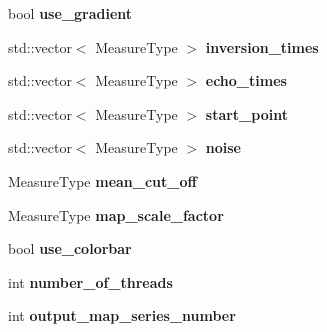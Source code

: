\begin{DoxyCompactItemize}
\item 
\hypertarget{struct_ox_1_1_tomato_options_a367c540e5413f8ffa3a6bc6ef5781b45}{bool {\bfseries use\-\_\-gradient}}\label{struct_ox_1_1_tomato_options_a367c540e5413f8ffa3a6bc6ef5781b45}

\item 
\hypertarget{struct_ox_1_1_tomato_options_ab7ac986b6ad257e73eda3d524f85fe85}{std\-::vector$<$ Measure\-Type $>$ {\bfseries inversion\-\_\-times}}\label{struct_ox_1_1_tomato_options_ab7ac986b6ad257e73eda3d524f85fe85}

\item 
\hypertarget{struct_ox_1_1_tomato_options_ae70219d5c42877178575baa5d6ae51c3}{std\-::vector$<$ Measure\-Type $>$ {\bfseries echo\-\_\-times}}\label{struct_ox_1_1_tomato_options_ae70219d5c42877178575baa5d6ae51c3}

\item 
\hypertarget{struct_ox_1_1_tomato_options_a0eced6fbbc1270e5d437a18ba950c06c}{std\-::vector$<$ Measure\-Type $>$ {\bfseries start\-\_\-point}}\label{struct_ox_1_1_tomato_options_a0eced6fbbc1270e5d437a18ba950c06c}

\item 
\hypertarget{struct_ox_1_1_tomato_options_ae9352986deb21ca97d4fd34daf564241}{std\-::vector$<$ Measure\-Type $>$ {\bfseries noise}}\label{struct_ox_1_1_tomato_options_ae9352986deb21ca97d4fd34daf564241}

\item 
\hypertarget{struct_ox_1_1_tomato_options_af81d1a55409036109d253b313d59e972}{Measure\-Type {\bfseries mean\-\_\-cut\-\_\-off}}\label{struct_ox_1_1_tomato_options_af81d1a55409036109d253b313d59e972}

\item 
\hypertarget{struct_ox_1_1_tomato_options_ab245e10cf32b36c48d66208a5f505099}{Measure\-Type {\bfseries map\-\_\-scale\-\_\-factor}}\label{struct_ox_1_1_tomato_options_ab245e10cf32b36c48d66208a5f505099}

\item 
\hypertarget{struct_ox_1_1_tomato_options_aa762826a11ff767aa969bd66c29b577f}{bool {\bfseries use\-\_\-colorbar}}\label{struct_ox_1_1_tomato_options_aa762826a11ff767aa969bd66c29b577f}

\item 
\hypertarget{struct_ox_1_1_tomato_options_a54efb4945f2857ee4ed9e1d5552fc3dd}{int {\bfseries number\-\_\-of\-\_\-threads}}\label{struct_ox_1_1_tomato_options_a54efb4945f2857ee4ed9e1d5552fc3dd}

\item 
\hypertarget{struct_ox_1_1_tomato_options_ab20a779c5a8dd371ec9356e3f9ce79c9}{int {\bfseries output\-\_\-map\-\_\-series\-\_\-number}}\label{struct_ox_1_1_tomato_options_ab20a779c5a8dd371ec9356e3f9ce79c9}


\end{DoxyCompactItemize}
